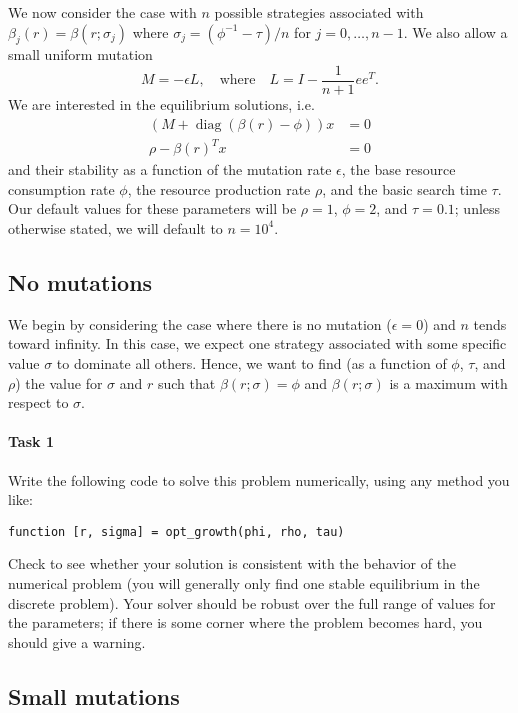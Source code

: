 \documentclass[12pt, leqno]{article} %
\begin{document}
We now consider the case with $n$ possible strategies associated with
$\beta_j(r) = \beta(r; \sigma_j)$ where
$\sigma_{j} = (\phi^{-1}-\tau)/n$ for $j = 0, \ldots, n-1$.
We also allow a small uniform mutation
\[
  M = -\epsilon L, \quad \mbox{where} \quad L = I - \frac{1}{n+1} ee^T.
\]
We are interested in the equilibrium solutions, i.e.
\begin{align*}
  \left(M + \operatorname{diag}(\beta(r)-\phi)\right)x &= 0\\
  \rho - \beta(r)^T x &= 0
\end{align*}
and their stability as a function of the mutation rate $\epsilon$, the
base resource consumption rate $\phi$, the resource production rate
$\rho$, and the basic search time $\tau$.  Our default values for
these parameters will be $\rho = 1$, $\phi = 2$, and $\tau = 0.1$;
unless otherwise stated, we will default to $n = 10^4$.

\subsection{No mutations}

We begin by considering the case where there is no mutation
($\epsilon = 0$) and $n$ tends toward infinity.  In this case,
we expect one strategy associated with some specific value $\sigma$
to dominate all others.  Hence, we want to find
(as a function of $\phi$, $\tau$, and $\rho$) the value
for $\sigma$ and $r$ such that $\beta(r; \sigma) = \phi$ and
$\beta(r; \sigma)$ is a maximum with respect to $\sigma$.

\paragraph{Task 1}
Write the following code to solve this problem numerically,
using any method you like:
\begin{lstlisting}[frame=single]
function [r, sigma] = opt_growth(phi, rho, tau)
\end{lstlisting}
Check to see whether your solution is consistent with the behavior
of the numerical problem (you will generally only find one
stable equilibrium in the discrete problem).  Your solver should
be robust over the full range of values for the parameters;
if there is some corner where the problem becomes hard, you should
give a warning.

\subsection{Small mutations}
\end{document}
